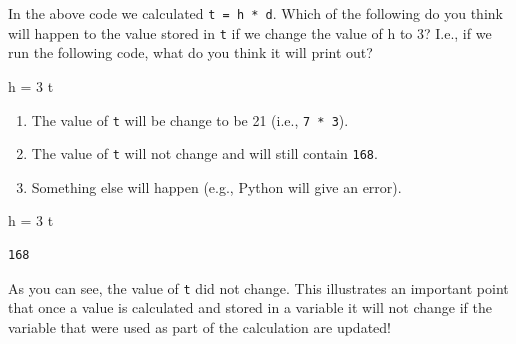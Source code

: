 \documentclass[
  letterpaper,
  DIV=11,
  numbers=noendperiod]{scrreprt}
\newenvironment{Shaded}{\begin{snugshade}}{\end{snugshade}}
\newcommand{\DecValTok}[1]{\textcolor[rgb]{0.68,0.00,0.00}{#1}}
\newcommand{\NormalTok}[1]{\textcolor[rgb]{0.00,0.23,0.31}{#1}}
\newcommand{\OperatorTok}[1]{\textcolor[rgb]{0.37,0.37,0.37}{#1}}
\providecommand{\tightlist}{%
  \setlength{\itemsep}{0pt}\setlength{\parskip}{0pt}}\usepackage{longtable,booktabs,array}
\begin{document}
\begin{tcolorbox}[enhanced jigsaw, colframe=quarto-callout-tip-color-frame, toprule=.15mm, left=2mm, breakable, colbacktitle=quarto-callout-tip-color!10!white, arc=.35mm, opacityback=0, colback=white, leftrule=.75mm, title=\textcolor{quarto-callout-tip-color}{\faLightbulb}\hspace{0.5em}{Exercise}, bottomrule=.15mm, bottomtitle=1mm, toptitle=1mm, titlerule=0mm, rightrule=.15mm, opacitybacktitle=0.6, coltitle=black]

In the above code we calculated \texttt{t\ =\ h\ *\ d}. Which of the
following do you think will happen to the value stored in \texttt{t} if
we change the value of h to 3? I.e., if we run the following code, what
do you think it will print out?

\begin{Shaded}
\begin{Highlighting}[]
\NormalTok{h }\OperatorTok{=} \DecValTok{3}
\NormalTok{t}
\end{Highlighting}
\end{Shaded}

\begin{enumerate}
\def\labelenumi{\alph{enumi}.}
\tightlist
\item
  The value of \texttt{t} will be change to be 21 (i.e.,
  \texttt{7\ *\ 3}).
\item
  The value of \texttt{t} will not change and will still contain
  \texttt{168}.
\item
  Something else will happen (e.g., Python will give an error).
\end{enumerate}

\end{tcolorbox}

\begin{tcolorbox}[enhanced jigsaw, colframe=quarto-callout-note-color-frame, toprule=.15mm, left=2mm, breakable, colbacktitle=quarto-callout-note-color!10!white, arc=.35mm, opacityback=0, colback=white, leftrule=.75mm, title=\textcolor{quarto-callout-note-color}{\faInfo}\hspace{0.5em}{Solution}, bottomrule=.15mm, bottomtitle=1mm, toptitle=1mm, titlerule=0mm, rightrule=.15mm, opacitybacktitle=0.6, coltitle=black]

\begin{Shaded}
\begin{Highlighting}[]
\NormalTok{h }\OperatorTok{=} \DecValTok{3}
\NormalTok{t}
\end{Highlighting}
\end{Shaded}

\begin{verbatim}
168
\end{verbatim}

As you can see, the value of \texttt{t} did not change. This illustrates
an important point that once a value is calculated and stored in a
variable it will not change if the variable that were used as part of
the calculation are updated!

\end{tcolorbox}
\end{document}
